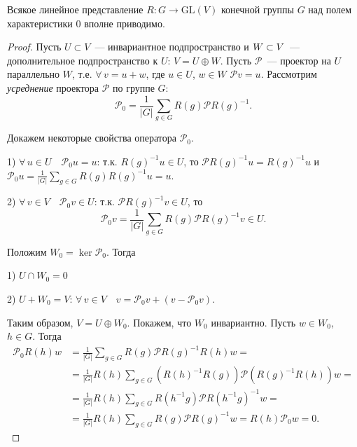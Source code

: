\documentclass[a4paper]{article}
\newcommand*{\p}[1]{#1\nobreak\discretionary{}{\hbox{$\mathsurround=0pt #1$}}{}}
\begin{document}
\begin{theorem}
Всякое линейное представление $R\colon G\to \mathrm{GL}(V)$ конечной
группы $G$ над полем характеристики 0 вполне приводимо.
\end{theorem}

\begin{proof}
Пусть $U\subset V$~--- инвариантное подпространство и $W\p\subset
V$~--- дополнительное подпространство к $U$: $V=U\oplus W$. Пусть
$\mathcal{P}$~--- проектор на $U$ параллельно $W$, т.е. $\forall \,
v=u+w$, где $u\in U$, $w\in W$ \quad $\mathcal{P}v=u$. Рассмотрим
\emph{усреднение} проектора $\mathcal{P}$ по группе $G$:
$$\mathcal{P}_0=\frac{1}{|G|}\sum\limits_{g\in
G}R(g)\mathcal{P}R(g)^{-1}.$$

Докажем некоторые свойства оператора $\mathcal{P}_0$.

1) $\forall \, u\in U\quad \mathcal{P}_0u=u$: т.к. $R(g)^{-1}u\in
U$, то $\mathcal{P}R(g)^{-1}u=R(g)^{-1}u$ и
$\mathcal{P}_0u=\frac{1}{|G|}\sum\limits_{g\in G}R(g)R(g)^{-1}u=u$.

2) $\forall \, v\in V\quad \mathcal{P}_0v\in U$: т.к.
$\mathcal{P}R(g)^{-1}v\in U$, то
$$\mathcal{P}_0v=\frac{1}{|G|}\sum\limits_{g\in
G}R(g)\mathcal{P}R(g)^{-1}v\in U.$$

Положим $W_0=\ker \mathcal{P}_0$. Тогда

1) $U\cap W_0=0$

2) $U+W_0=V$: $\forall \, v\in V\quad
v=\mathcal{P}_0v+(v-\mathcal{P}_0v)$.

Таким образом, $V=U\oplus W_0$. Покажем, что $W_0$ инвариантно.
Пусть $w\in W_0$, $h\in G$. Тогда
$$
\begin{aligned}
\mathcal{P}_0R(h)w &=\frac{1}{|G|}\sum\limits_{g\in
G}R(g)\mathcal{P}R(g)^{-1}R(h)w=\\
&=\frac{1}{|G|}R(h)\sum\limits_{g\in
G}(R(h)^{-1}R(g))\mathcal{P}(R(g)^{-1}R(h))w=\\
&=\frac{1}{|G|}R(h)\sum\limits_{g\in
G}R(h^{-1}g)\mathcal{P}R(h^{-1}g)^{-1}w=\\
&=\frac{1}{|G|}R(h)\sum\limits_{g\in
G}R(g)\mathcal{P}R(g)^{-1}w=R(h)\mathcal{P}_0w=0.
\end{aligned}$$
\end{proof}
\end{document}
